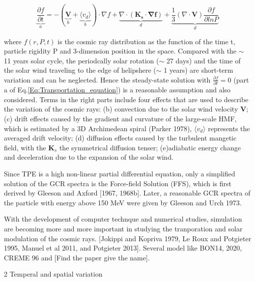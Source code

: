 	\begin{equation}
		\underbrace{\frac{\partial f}{\partial t}}_{a} = - ( \underbrace{\boldsymbol{V}}_{b} + \underbrace{\langle v_d \rangle }_{b}) \cdot \nabla f + \underbrace{\nabla \cdot (\boldsymbol{K_s \cdot \nabla f})}_{d} + \underbrace{\frac{1}{3}(\nabla \cdot \boldsymbol{V}) \frac{\partial f}{\partial ln P}}_{d}
		\label{Eq:Transportation_equation}
	\end{equation}

where $f(r, P, t)$ is the cosmic ray distribution as the function of the time t, particle rigidity P and 3-dimension position in the space. Compared with the $\sim$ 11 years solar cycle, the periodcally solar rotation ($\sim$ 27 days) and  the time of the solar wind traveling to the edge of helipshere ($\sim$ 1 years) are short-term variation and can be neglected. Hence the steady-state solution with  $\frac{\partial f}{\partial t} = 0$ (part a of Eq.\ref{Eq:Transportation_equation}) is a reasonable assumption and also considered. Terms in the right parts include four effects that are used to describe the variation of the cosmic rays: (b) convection due to the solar wind velocity $\boldsymbol{V}$; (c) drift effects caused by the gradient and curvature of the large-scale \ac{HMF}, which is estimated by a 3D Archimedean spiral (Parker 1978), $\langle v_d \rangle$ represents the averaged drift velocity; (d) diffusion effects caused by the turbulent mangetic field, with the $\boldsymbol{K}_s$ the symmetrical diffusion tenser; (e)adiabatic energy change and deceleration due to the expansion of the solar wind. 

Since TPE is a high non-linear partial differential equation, only a simplified solution of the GCR spectra is the Force-field Solution (FFS), which is first derived by Gleeson and Axford [1967, 1968b]. Later, a reasonable GCR spectra of the particle with energy above 150 MeV were given by Gleeson and Urch 1973.

With the development of computer technque and numerical studies, simulation are becoming more and more important in studying the tranporation and solar modulation of the cosmic rays. [Jokippi and Kopriva 1979, Le Roux and Potgieter 1995, Manuel et al 2011, and Potgieter 2013]. 
Several model like BON14, 2020, CREME 96 and [Find the paper give the name]. 



	
2 Temperal and spatial variation

